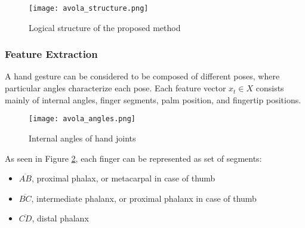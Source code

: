 \begin{figure}[ht]
    \centering
    \texttt{[image: avola\_structure.png]}
    \caption{Logical structure of the proposed method \cite{avola}}
    \label{fig:lstm_gesture_structure}
\end{figure}

\subsubsection{Feature Extraction}
\label{sec:feature_extraction}

A hand gesture can be considered to be composed of different poses, where particular angles characterize each pose. Each feature vector $x_t \in X$ consists mainly of internal angles, finger segments, palm position, and fingertip positions.

\begin{figure}[ht]
    \centering
    \texttt{[image: avola\_angles.png]}
    \caption{Internal angles of hand joints \cite{avola}}
    \label{fig:lstm_angles}
\end{figure}

As seen in Figure \ref{fig:lstm_angles}, each finger can be represented as set of segments:
\begin{itemize}
    \item $\overline{AB}$, proximal phalax, or metacarpal in case of thumb
    \item $\overline{BC}$, intermediate phalanx, or proximal phalanx in case of thumb
    \item $\overline{CD}$, distal phalanx
\end{itemize}

